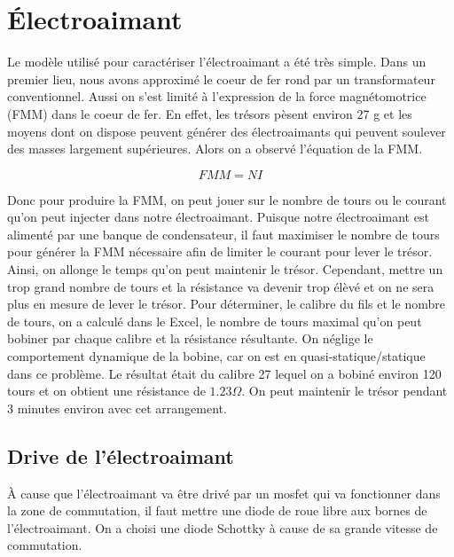 \section{Électroaimant}
Le modèle utilisé pour caractériser l'électroaimant a été très simple.
Dans un premier lieu, nous avons approximé le coeur de fer rond par un transformateur conventionnel.
Aussi on s'est limité à l'expression de la force magnétomotrice (FMM) dans le coeur de fer. En effet, les trésors pèsent environ 27 g et les moyens dont on dispose peuvent générer des électroaimants
qui peuvent soulever des masses largement supérieures. Alors on a observé l'équation de la FMM.

\begin{equation}
FMM = NI
\end{equation}

Donc pour produire la FMM, on peut jouer sur le nombre de tours ou le courant qu'on peut injecter dans notre électroaimant.
Puisque notre électroaimant est alimenté par une banque de condensateur, il faut maximiser le nombre de tours pour générer la FMM nécessaire afin de limiter le courant pour lever le trésor.
Ainsi, on allonge le temps qu'on peut maintenir le trésor. Cependant, mettre un trop grand nombre de tours et la résistance va devenir trop élèvé et on ne sera plus en mesure de lever le trésor.
Pour déterminer, le calibre du fils et le nombre de tours, on a calculé dans le Excel, le nombre de tours maximal qu'on peut bobiner par chaque calibre et la résistance résultante.
On néglige le comportement dynamique de la bobine, car on est en quasi-statique/statique dans ce problème. Le résultat était du calibre 27 lequel on a bobiné environ 120 tours et on obtient
une résistance de $1.23 \Omega$. On peut maintenir le trésor pendant 3 minutes environ avec cet arrangement.

\subsection{Drive de l'électroaimant}

À cause que l'électroaimant va être drivé par un mosfet qui va fonctionner dans la zone de commutation, il faut mettre une diode de roue libre aux bornes de l'électroaimant.
On a choisi une diode Schottky à cause de sa grande vitesse de commutation.


